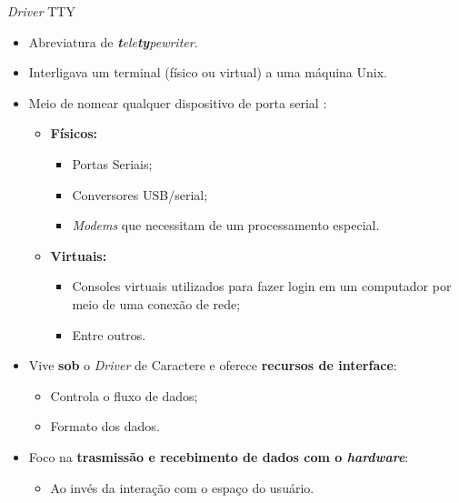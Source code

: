 	\begin{frame}{\textit{Driver} TTY}
		\begin{itemize}
			\item Abreviatura de \textit{\textbf{t}ele\textbf{t}\textbf{y}pewriter}.
			\item Interligava um terminal (físico ou virtual) a uma máquina Unix.
			\item Meio de nomear qualquer dispositivo de porta serial \cite{corbet2005linux}:
			\begin{itemize}
				\item \textbf{Físicos:}
				\begin{itemize}
					\item Portas Seriais;
					\item Conversores USB/serial;
					\item \textit{Modems} que necessitam de um processamento especial.
				\end{itemize}
				\item \textbf{Virtuais:}
				\begin{itemize}
					\item Consoles virtuais utilizados para fazer login em um computador por meio de uma conexão de rede;
					\item Entre outros.
				\end{itemize}
			\end{itemize}
			\item Vive \textbf{sob} o \textit{Driver} de Caractere e oferece \textbf{recursos de interface}:
			\begin{itemize}
				\item Controla o fluxo de dados;
				\item Formato dos dados.
			\end{itemize}
			\item Foco na \textbf{trasmissão e recebimento de dados com o \textit{hardware}}:
			\begin{itemize}
				\item Ao invés da interação com o espaço do usuário.
			\end{itemize}
		\end{itemize}
	\end{frame}
